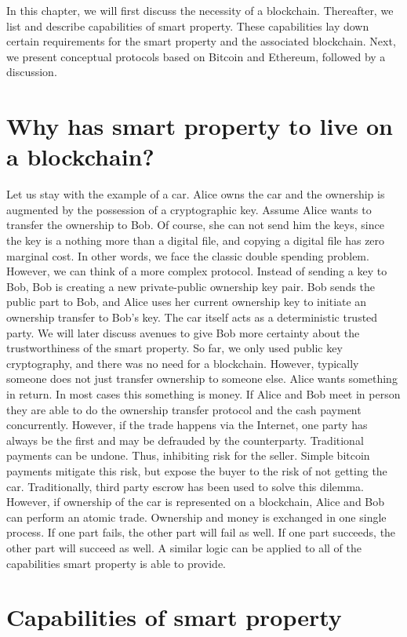 In this chapter, we will first discuss the necessity of a blockchain. Thereafter, we list and describe capabilities of smart property. These capabilities lay down certain requirements for the smart property and the associated blockchain. Next, we present conceptual protocols based on Bitcoin and Ethereum, followed by a discussion. 

\section{Why has smart property to live on a blockchain?}

Let us stay with the example of a car. Alice owns the car and the ownership is augmented by the possession of a cryptographic key. Assume Alice wants to transfer the ownership to Bob. Of course, she can not send him the keys, since the key is a nothing more than a digital file, and copying a digital file has zero marginal cost. In other words, we face the classic double spending problem. However, we can think of a more complex protocol. Instead of sending a key to Bob, Bob is creating a new private-public ownership key pair. Bob sends the public part to Bob, and Alice uses her current ownership key to initiate an ownership transfer to Bob's key. The car itself acts as a deterministic trusted party. We will later discuss avenues to give Bob more certainty about the trustworthiness of the smart property.
So far, we only used public key cryptography, and there was no need for a blockchain. However, typically someone does not just transfer ownership to someone else. Alice wants something in return. In most cases this something is money. If Alice and Bob meet in person they are able to do the ownership transfer protocol and the cash payment concurrently. However, if the trade happens via the Internet, one party has always be the first and may be defrauded by the counterparty. Traditional payments can be undone. Thus, inhibiting risk for the seller. Simple bitcoin payments mitigate this risk, but expose the buyer to the risk of not getting the car. Traditionally, third party escrow has been used to solve this dilemma.
However, if ownership of the car is represented on a blockchain, Alice and Bob can perform an atomic trade. Ownership and money is exchanged in one single process. If one part fails, the other part will fail as well. If one part succeeds, the other part will succeed as well. A similar logic can be applied to all of the capabilities smart property is able to provide.


\section{Capabilities of smart property}

